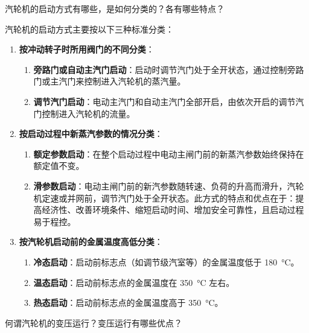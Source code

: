 \begin{problem}
汽轮机的启动方式有哪些，是如何分类的？各有哪些特点？
\end{problem}

\begin{solution}
汽轮机的启动方式主要按以下三种标准分类：

\begin{enumerate}
  \item \textbf{按冲动转子时所用阀门的不同分类}：
  \begin{enumerate}
    \item \textbf{旁路门或自动主汽门启动}：启动时调节汽门处于全开状态，通过控制旁路门或主汽门来控制进入汽轮机的蒸汽量。
    \item \textbf{调节汽门启动}：电动主汽门和自动主汽门全部开启，由依次开启的调节汽门控制进入汽轮机的流量。
  \end{enumerate}
  \item \textbf{按启动过程中新蒸汽参数的情况分类}：
  \begin{enumerate}
    \item \textbf{额定参数启动}：在整个启动过程中电动主闸门前的新蒸汽参数始终保持在额定值不变。
    \item \textbf{滑参数启动}：电动主闸门前的新汽参数随转速、负荷的升高而滑升，汽轮机定速或并网前，调节汽门处于全开状态。此方式的特点和优点在于：提高经济性、改善环境条件、缩短启动时间、增加安全可靠性，且启动过程易于程控。
  \end{enumerate}
  \item \textbf{按汽轮机启动前的金属温度高低分类}：
  \begin{enumerate}
    \item \textbf{冷态启动}：启动前标志点（如调节级汽室等）的金属温度低于 \qty{180}{\degreeCelsius}。
    \item \textbf{温态启动}：启动前标志点的金属温度在 \qty{350}{\degreeCelsius} 左右。
    \item \textbf{热态启动}：启动前标志点的金属温度高于 \qty{350}{\degreeCelsius}。
  \end{enumerate}
\end{enumerate}
\end{solution}

\begin{problem}
何谓汽轮机的变压运行？变压运行有哪些优点？
\end{problem}

